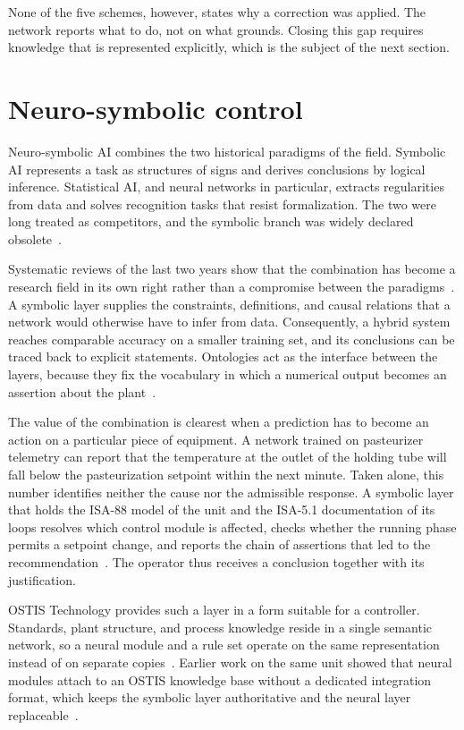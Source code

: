 None of the five schemes, however, states why a correction was applied. The
network reports what to do, not on what grounds. Closing this gap requires
knowledge that is represented explicitly, which is the subject of the next
section.

\section{Neuro-symbolic control}

Neuro-symbolic AI combines the two historical paradigms of the field. Symbolic
AI represents a task as structures of signs and derives conclusions by logical
inference. Statistical AI, and neural networks in particular, extracts
regularities from data and solves recognition tasks that resist formalization.
The two were long treated as competitors, and the symbolic branch was widely
declared obsolete~\cite{Bhuyan2024}.

Systematic reviews of the last two years show that the combination has become a
research field in its own right rather than a compromise between the
paradigms~\cite{Colelough2025}. A symbolic layer supplies the constraints,
definitions, and causal relations that a network would otherwise have to infer
from data. Consequently, a hybrid system reaches comparable accuracy on a
smaller training set, and its conclusions can be traced back to explicit
statements. Ontologies act as the interface between the layers, because they fix
the vocabulary in which a numerical output becomes an assertion about the
plant~\cite{Confalonieri2025}.

The value of the combination is clearest when a prediction has to become an
action on a particular piece of equipment. A network trained on pasteurizer
telemetry can report that the temperature at the outlet of the holding tube will
fall below the pasteurization setpoint within the next minute. Taken alone, this
number identifies neither the cause nor the admissible response. A symbolic
layer that holds the ISA-88 model of the unit and the ISA-5.1 documentation of
its loops resolves which control module is affected, checks whether the running
phase permits a setpoint change, and reports the chain of assertions that led to
the recommendation~\cite{ISA-88-formalization, isa-5.1-ostis}. The operator thus
receives a conclusion together with its justification.

OSTIS Technology provides such a layer in a form suitable for a controller.
Standards, plant structure, and process knowledge reside in a single semantic
network, so a neural module and a rule set operate on the same representation
instead of on separate copies~\cite{Golenkov2019, ivaniuk2025neurosymbolic}.
Earlier work on the same unit showed that neural modules attach to an OSTIS
knowledge base without a dedicated integration format, which keeps the symbolic
layer authoritative and the neural layer
replaceable~\cite{Golovko2018integration, ivaniuk2024neurosemantic}.

